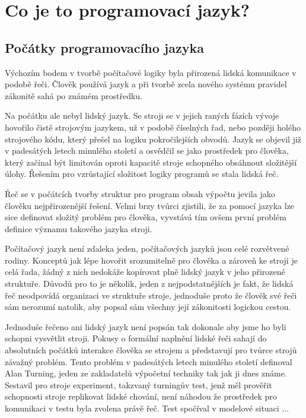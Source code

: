 \documentclass[11pt]{book}
\newcommand{\oddil}[1]{\section{#1}\label{sec:#1}}
\begin{document}
\chapter{Co je to programovací jazyk?}

\oddil{Počátky programovacího jazyka}


Výchozím bodem v tvorbě počítačové logiky byla přirozená lidská komunikace v podobě řeči. Člověk používá jazyk  a při tvorbě zcela nového systému pravidel zákonitě sahá po známém prostředku.

Na počátku ale nebyl lidský jazyk. Se stroji se v jejich raných fázích vývoje hovořilo čistě strojovým jazykem, už v podobě číselných řad, nebo později holého strojového kódu, který přešel na logiku pokročilejších obvodů. Jazyk se objevil již v padesátých letech minulého století a osvědčil se jako prostředek pro člověka, který začínal být limitován oproti kapacitě stroje schopného obsáhnout složitější úlohy. Řešením pro vzrůstající složitost logiky programů se stala lidská řeč.

Řeč se v počátcích tvorby struktur pro program obsah výpočtu jevila jako člověku nejpřirozenější řešení. Velmi brzy tvůrci zjistili, že za pomocí jazyka lze sice definovat složitý problém pro člověka, vyvstává tím ovšem první problém definice významu takového jazyka stroji.

Počítačový jazyk není zdaleka jeden, počítačových jazyků jsou celé rozvětvené rodiny. Konceptů jak lépe hovořit srozumitelně pro člověka a zároveň ke stroji je celá řada, žádný z nich nedokáže kopírovat plně lidský jazyk v jeho přirozené struktuře. Důvodů pro to je několik, jeden z nejpodstatnějších je fakt, že lidská řeč neodpovídá organizaci ve struktuře stroje, jednoduše proto že člověk své řeči sám nerozumí natolik, aby popsal sám všechny její zákonitosti logickou cestou.

Jednoduše řečeno ani lidský jazyk není popsán tak dokonale aby jsme ho byli schopni vysvětlit stroji. Pokusy o formální naplnění lidské řeči sahají do absolutních počátků interakce člověka se strojem a představují pro tvůrce strojů závažný problém. Tento problém v padesátých letech minulého století definoval Alan Turning, jeden ze zakladatelů výpočetní techniky tak jak ji dnes známe. Sestavil pro stroje experiment, takzvaný turningův test, jenž měl prověřit schopnosti stroje replikovat lidské chování, není náhodou že prostředek pro komunikaci v testu byla zvolena právě řeč. Test spočíval v modelové situaci ...
\end{document}
